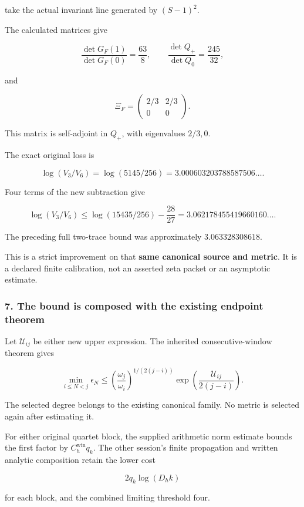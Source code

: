 take the actual invariant line generated by \((S-1)^2\).

The calculated matrices give

\[
\frac{\det G_F(1)}{\det G_F(0)}=\frac{63}{8},
\qquad
\frac{\det Q_+}{\det Q_0}=\frac{245}{32},
\]

and

\[
\Xi_F=
\begin{pmatrix}
2/3&2/3\\
0&0
\end{pmatrix}.
\]

This matrix is self-adjoint in \(Q_+\), with eigenvalues \(2/3,0\).

The exact original loss is

\[
\log(V_3/V_6)=\log(5145/256)
=3.000603203788587506\ldots.
\]

Four terms of the new subtraction give

\[
\boxed{
\log(V_3/V_6)
\le
\log(15435/256)-\frac{28}{27}
=
3.062178455419660160\ldots.
}
\]

The preceding full two-trace bound was approximately \(3.063328308618\).

This is a strict improvement on that \textbf{same canonical source and metric}. It is a declared finite calibration, not an asserted zeta packet or an asymptotic estimate.

\subsubsection{7. The bound is composed with the existing endpoint theorem}\label{endpoint-exponential_constituent_original--the-bound-is-composed-with-the-existing-endpoint-theorem}

Let \(\mathscr U_{ij}\) be either new upper expression. The inherited consecutive-window theorem gives

\[
\boxed{
\min_{i\le N<j}\epsilon_N
\le
\left(\frac{\omega_j}{\omega_i}\right)^{1/(2(j-i))}
\exp\!\left(\frac{\mathscr U_{ij}}{2(j-i)}\right).
}
\]

The selected degree belongs to the existing canonical family. No metric is selected again after estimating it.

For either original quartet block, the supplied arithmetic norm estimate bounds the first factor by \(C_h^{\mathrm{win}}q_k\). The other session's finite propagation and written analytic composition retain the lower cost

\[
2q_k\log(D_hk)
\]

for each block, and the combined limiting threshold four.

